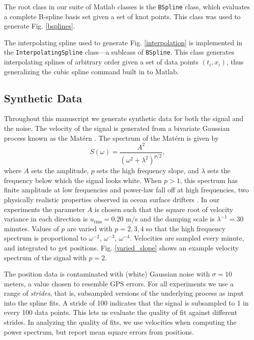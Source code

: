 \documentclass{ametsoc}
\begin{document}
The root class in our suite of Matlab classes is the \texttt{BSpline} class, which evaluates a complete B-spline basis set given a set of knot points. This class was used to generate Fig. \ref{bsplines}.

The interpolating spline used to generate Fig. \ref{interpolation} is implemented in the \texttt{InterpolatingSpline} class---a sublcass of \texttt{BSpline}. This class generates interpolating splines of arbitrary order given a set of data points $(t_i, x_i)$, thus generalizing the cubic spline command built in to Matlab.

\subsection{Synthetic Data}
\label{subsec:synthetic_data}

Throughout this manuscript we generate synthetic data for both the signal and the noise. The velocity of the signal is generated from a bivariate Gaussian process known as the Mat\'ern \citep{lilly2017-npg}. The spectrum of the Mat\'ern is given by
\begin{equation}
S(\omega) = \frac{A^2}{(\omega^2 + \lambda^2)^{p/2}},
\end{equation}
where $A$ sets the amplitude, $p$ sets the high frequency slope, and $\lambda$ sets the frequency below which the signal looks white. When $p>1$, this spectrum has finite amplitude at low frequencies and power-law fall off at high frequencies, two physically realistic properties observed in ocean surface drifters \citep{sykulski2016-jrssc}.
In our experiments the parameter $A$ is chosen such that the square root of velocity variance in each direction is $u_{\textrm{rms}}=0.20$ m/s and the damping scale is $\lambda^{-1}=30$ minutes. Values of $p$ are varied with $p=2,3,4$ so that the high frequency spectrum is proportional to $\omega^{-2}$, $\omega^{-3}$, $\omega^{-4}$. Velocities are sampled every minute, and integrated to get positions. Fig. \ref{varied_slope} shows an example velocity spectrum of the signal with $p=2$.

The position data is contaminated with (white) Gaussian noise with $\sigma=10$ meters, a value chosen to resemble GPS errors. For all experiments we use a range of \emph{strides}, that is, subsampled versions of the underlying process as input into the spline fits. A stride of 100 indicates that the signal is subsampled to 1 in every 100 data points. This lets us evaluate the quality of fit against different strides. In analyzing the quality of fits, we use velocities when computing the power spectrum, but report mean square errors from positions.
\end{document}
